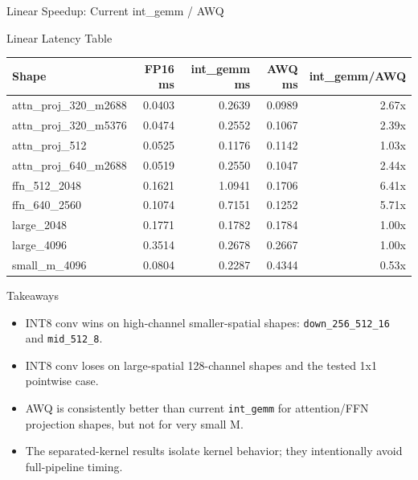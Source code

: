\documentclass[aspectratio=169]{beamer}
\begin{document}
\begin{frame}{Linear Speedup: Current int\_gemm / AWQ}
\centering

\end{frame}

\begin{frame}{Linear Latency Table}
\scriptsize
\begin{tabular}{lrrrr}
\toprule
Shape & FP16 ms & int\_gemm ms & AWQ ms & int\_gemm/AWQ \\
\midrule
attn\_proj\_320\_m2688 & 0.0403 & 0.2639 & 0.0989 & 2.67x \\
attn\_proj\_320\_m5376 & 0.0474 & 0.2552 & 0.1067 & 2.39x \\
attn\_proj\_512 & 0.0525 & 0.1176 & 0.1142 & 1.03x \\
attn\_proj\_640\_m2688 & 0.0519 & 0.2550 & 0.1047 & 2.44x \\
ffn\_512\_2048 & 0.1621 & 1.0941 & 0.1706 & 6.41x \\
ffn\_640\_2560 & 0.1074 & 0.7151 & 0.1252 & 5.71x \\
large\_2048 & 0.1771 & 0.1782 & 0.1784 & 1.00x \\
large\_4096 & 0.3514 & 0.2678 & 0.2667 & 1.00x \\
small\_m\_4096 & 0.0804 & 0.2287 & 0.4344 & 0.53x \\
\bottomrule
\end{tabular}
\end{frame}

\begin{frame}{Takeaways}
\begin{itemize}
  \item INT8 conv wins on high-channel smaller-spatial shapes: \texttt{down\_256\_512\_16} and \texttt{mid\_512\_8}.
  \item INT8 conv loses on large-spatial 128-channel shapes and the tested 1x1 pointwise case.
  \item AWQ is consistently better than current \texttt{int\_gemm} for attention/FFN projection shapes, but not for very small M.
  \item The separated-kernel results isolate kernel behavior; they intentionally avoid full-pipeline timing.
\end{itemize}
\end{frame}
\end{document}
